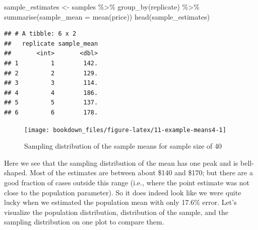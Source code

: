 \documentclass[
]{krantz}
\makeatletter
\newenvironment{Shaded}{\begin{snugshade}}{\end{snugshade}}
\newcommand{\AttributeTok}[1]{\textcolor[rgb]{0.61,0.61,0.61}{#1}}
\newcommand{\FunctionTok}[1]{\textcolor[rgb]{0,0,0}{#1}}
\newcommand{\NormalTok}[1]{#1}
\newcommand{\OtherTok}[1]{\textcolor[rgb]{0.37,0.37,0.37}{#1}}
\newcommand{\SpecialCharTok}[1]{\textcolor[rgb]{0,0,0}{#1}}
\newcommand{\StringTok}[1]{\textcolor[rgb]{0.5,0.5,0.5}{#1}}
\newenvironment{kframe}{%
\medskip{}
\setlength{\fboxsep}{.8em}
 \def\at@end@of@kframe{}%
 \ifinner\ifhmode%
  \def\at@end@of@kframe{\end{minipage}}%
  \begin{minipage}{\columnwidth}%
 \fi\fi%
 \def\FrameCommand##1{\hskip\@totalleftmargin \hskip-\fboxsep
 \colorbox{shadecolor}{##1}\hskip-\fboxsep
     \hskip-\linewidth \hskip-\@totalleftmargin \hskip\columnwidth}%
 \MakeFramed {\advance\hsize-\width
   \@totalleftmargin\z@ \linewidth\hsize
   \@setminipage}}%
 {\par\unskip\endMakeFramed%
 \at@end@of@kframe}
\renewenvironment{Shaded}{\begin{kframe}}{\end{kframe}}
\makeatother
\begin{document}
\begin{Shaded}
\begin{Highlighting}[]
\NormalTok{sample\_estimates }\OtherTok{\textless{}{-}}\NormalTok{ samples }\SpecialCharTok{\%\textgreater{}\%}
  \FunctionTok{group\_by}\NormalTok{(replicate) }\SpecialCharTok{\%\textgreater{}\%}
  \FunctionTok{summarise}\NormalTok{(}\AttributeTok{sample\_mean =} \FunctionTok{mean}\NormalTok{(price))}
\FunctionTok{head}\NormalTok{(sample\_estimates)}
\end{Highlighting}
\end{Shaded}

\begin{verbatim}
## # A tibble: 6 x 2
##   replicate sample_mean
##       <int>       <dbl>
## 1         1        142.
## 2         2        129.
## 3         3        114.
## 4         4        186.
## 5         5        137.
## 6         6        178.
\end{verbatim}

\begin{Shaded}
\end{Shaded}

\begin{figure}
\texttt{[image: bookdown\_files/figure-latex/11-example-means4-1]} \caption{Sampling distribution of the sample means for sample size of 40}\label{fig:11-example-means4}
\end{figure}

Here we see that the sampling distribution of the mean has one peak and is
bell-shaped. Most of the estimates are between
about \$140 and
\$170; but there are
a good fraction of cases outside this range (i.e., where the point estimate
was not close to the population parameter). So it does indeed look like we were quite lucky
when we estimated the population mean
with only 17.6\% error.
Let's visualize the population
distribution, distribution of the sample, and the sampling distribution on one
plot to compare them.
\end{document}
